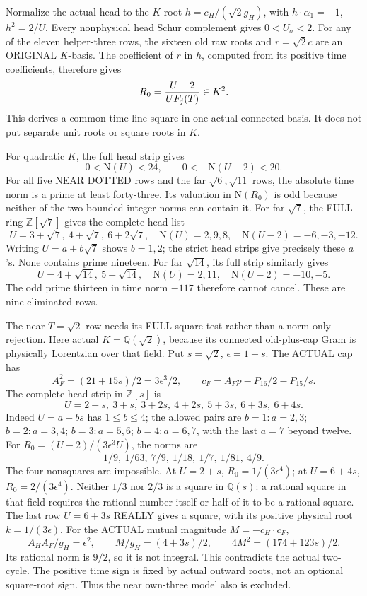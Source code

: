 Normalize the actual head to the \(K\)-root
\(h=c_H/(\sqrt2g_H)\), with
\(h\cdot\alpha_1=-1\), \(h^2=2/U\).
Every nonphysical head Schur complement gives
\(0<U_\sigma<2\).
For any of the eleven helper-three rows, the
sixteen old raw roots and \(r=\sqrt2c\) are an
ORIGINAL \(K\)-basis.
The coefficient of \(r\) in \(h\), computed from
its positive time coefficients, therefore gives
\[
                      R_0={U-2\over U F_j(T)}\in K^2 .
\]
This derives a common time-line square in one
actual connected basis.  It does not put separate
unit roots or square roots in \(K\).

For quadratic \(K\), the full head strip gives
\[
                     0<\mathrm N(U)<24,\qquad
                     0<-\mathrm N(U-2)<20.
\]
For all five NEAR DOTTED rows and the far
\(\sqrt6,\sqrt{11}\) rows, the absolute time
norm is a prime at least forty-three.
Its valuation in \(\mathrm N(R_0)\) is odd
because neither of the two bounded integer norms
can contain it.
For far \(\sqrt7\), the FULL ring
\(\mathbb Z[\sqrt7]\) gives the complete head list
\[
 U=3+\sqrt7,\ 4+\sqrt7,\ 6+2\sqrt7,
\quad \mathrm N(U)=2,9,8,\quad
 \mathrm N(U-2)=-6,-3,-12 .
\]
Writing \(U=a+b\sqrt7\) shows \(b=1,2\);
the strict head strips give precisely these \(a\)'s.
None contains prime nineteen.
For far \(\sqrt{14}\), its full strip similarly
gives
\[
 U=4+\sqrt{14},\ 5+\sqrt{14},\quad
 \mathrm N(U)=2,11,\quad\mathrm N(U-2)=-10,-5 .
\]
The odd prime thirteen in time norm \(-117\)
therefore cannot cancel.
These are nine eliminated rows.

The near \(T=\sqrt2\) row needs its FULL square
test rather than a norm-only rejection.
Here actual \(K=\mathbb Q(\sqrt2)\), because its
connected old-plus-cap Gram is physically Lorentzian
over that field.
Put \(s=\sqrt2\), \(\epsilon=1+s\).
The ACTUAL cap has
\[
 A_F^2=(21+15s)/2=3\epsilon^3/2,\qquad
 c_F=A_Fp-P_{16}/2-P_{15}/s .
\]
The complete head strip in \(\mathbb Z[s]\) is
\[
         U=2+s,\ 3+s,\ 3+2s,\ 4+2s,\ 5+3s,\ 6+3s,\ 6+4s .
\]
Indeed \(U=a+bs\) has \(1\le b\le4\);
the allowed pairs are
\(b=1:a=2,3\);
\(b=2:a=3,4\);
\(b=3:a=5,6\);
\(b=4:a=6,7\), with the last \(a=7\) beyond twelve.
For \(R_0=(U-2)/(3\epsilon^3U)\), the norms are
\[
                      1/9,\ 1/63,\ 7/9,\ 1/18,\ 1/7,\ 1/81,\ 4/9 .
\]
The four nonsquares are impossible.
At \(U=2+s\), \(R_0=1/(3\epsilon^4)\);
at \(U=6+4s\), \(R_0=2/(3\epsilon^4)\).
Neither \(1/3\) nor \(2/3\) is a square in
\(\mathbb Q(s)\): a rational square in that field
requires the rational number itself or half of
it to be a rational square.
The last row \(U=6+3s\) REALLY gives a square,
with its positive physical root \(k=1/(3\epsilon)\).
For the ACTUAL mutual magnitude \(M=-c_H\cdot c_F\),
\[
 A_HA_F/g_H=\epsilon^2,\qquad
 M/g_H=(4+3s)/2,\qquad
                    4M^2=(174+123s)/2 .
\]
Its rational norm is \(9/2\), so it is not integral.
This contradicts the actual two-cycle.
The positive time sign is fixed by actual outward
roots, not an optional square-root sign.
Thus the near own-three model also is excluded.

